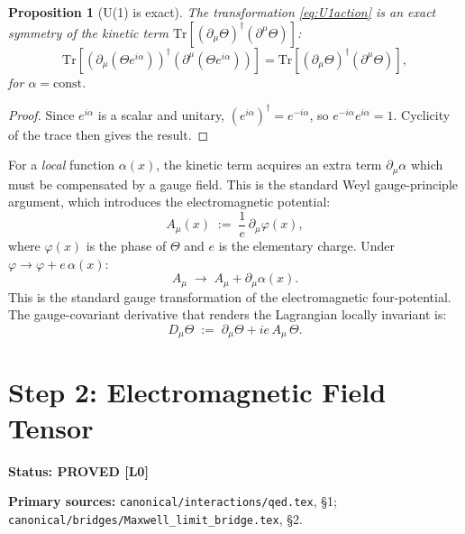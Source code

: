 \documentclass[11pt,a4paper]{article}
\newtheorem{proposition}{Proposition}
\newcommand{\Lzero}{\textbf{[L0]}}
\newcommand{\PROVED}{\textbf{PROVED}}
\begin{document}
\begin{proposition}[U(1) is exact]
\label{prop:U1exact}
The transformation \eqref{eq:U1action} is an exact symmetry of the kinetic
term $\mathrm{Tr}[(\partial_\mu\Theta)^\dagger(\partial^\mu\Theta)]$:
\begin{equation}
  \mathrm{Tr}[(\partial_\mu(\Theta e^{i\alpha}))^\dagger
              (\partial^\mu(\Theta e^{i\alpha}))]
  = \mathrm{Tr}[(\partial_\mu\Theta)^\dagger(\partial^\mu\Theta)],
\end{equation}
for $\alpha = \text{const}$.
\end{proposition}

\begin{proof}
Since $e^{i\alpha}$ is a scalar and unitary, $(e^{i\alpha})^\dagger = e^{-i\alpha}$,
so $e^{-i\alpha}e^{i\alpha} = 1$.  Cyclicity of the trace then gives the result.
\end{proof}

\noindent For a \emph{local} function $\alpha(x)$, the kinetic term acquires
an extra term $\partial_\mu\alpha$ which must be compensated by a gauge field.
This is the standard Weyl gauge-principle argument, which introduces the
electromagnetic potential:
\begin{equation}\label{eq:Amu}
  A_\mu(x) \;:=\; \frac{1}{e}\,\partial_\mu\varphi(x),
\end{equation}
where $\varphi(x)$ is the phase of $\Theta$ and $e$ is the elementary charge.
Under $\varphi \to \varphi + e\,\alpha(x)$:
\begin{equation}
  A_\mu \;\to\; A_\mu + \partial_\mu\alpha(x).
\end{equation}
This is the standard gauge transformation of the electromagnetic four-potential.
The gauge-covariant derivative that renders the Lagrangian locally invariant is:
\begin{equation}\label{eq:covderiv}
  D_\mu\Theta \;:=\; \partial_\mu\Theta + ie\,A_\mu\,\Theta.
\end{equation}

\section{Step 2: Electromagnetic Field Tensor}

\noindent\textbf{Status: \PROVED{} \Lzero}

\noindent\textbf{Primary sources:}
\texttt{canonical/interactions/qed.tex}, \S1;
\texttt{canonical/bridges/Maxwell\_limit\_bridge.tex}, \S2.
\end{document}
